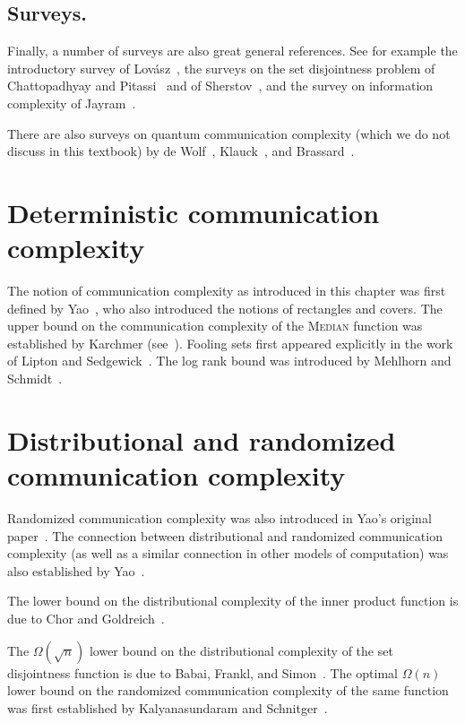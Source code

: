 \subsection*{Surveys.}
Finally, a number of surveys are also great general references. See for example the introductory survey of Lov{\'a}sz~\cite{Lovasz89}, the surveys on the set disjointness problem of Chattopadhyay and Pitassi~\cite{ChattopadhyayP10} and of Sherstov~\cite{Sherstov14}, and the survey on information complexity of Jayram~\cite{Jayram10}. 

There are also surveys on quantum communication complexity (which we do not discuss in this textbook) by de Wolf~\cite{deWolf02}, Klauck~\cite{Klauck00}, and Brassard~\cite{Brassard04}.


\section{Deterministic communication complexity}

The notion of communication complexity as introduced in this chapter was first defined by Yao~\cite{Yao79}, who also introduced the notions of rectangles and covers. The upper bound on the communication complexity of the \textsc{Median} function was established by Karchmer (see~\cite[\S 1.5]{KushilevitzN97}).
Fooling sets first appeared explicitly in the work of Lipton and Sedgewick~\cite{LiptonS81}.
The log rank bound was introduced by Mehlhorn and Schmidt~\cite{MehlhornS82}.


\section{Distributional and randomized communication complexity}

Randomized communication complexity was also introduced in Yao's original paper~\cite{Yao79}. The connection between distributional and randomized communication complexity (as well as a similar connection in other models of computation) was also established by Yao~\cite{Yao83}. 

The lower bound on the distributional complexity of the inner product function is due to Chor and Goldreich~\cite{ChorG85}.

The $\Omega(\sqrt{n})$ lower bound on the distributional complexity of the set disjointness function is due to Babai, Frankl, and Simon~\cite{BabaiFS86}. The optimal $\Omega(n)$ lower bound on the randomized communication complexity of the same function was first established by Kalyanasundaram and Schnitger~\cite{KalyanasundaramS92}.

